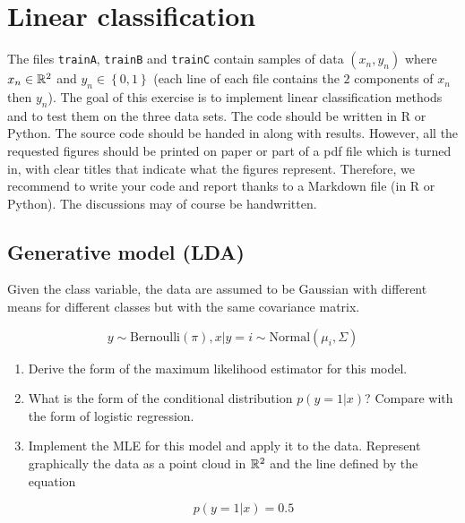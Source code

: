 \documentclass[a4paper, 11pt]{article}
\begin{document}
\pagebreak
\section{Linear classification}

The files \texttt{trainA}, \texttt{trainB} and \texttt{trainC} contain samples of data $(x_n, y_n)$ where $x_n \in \mathbb{R}^2$ and $y_n \in \left\{ 0, 1 \right\}$ (each line of each file contains the $2$ components of $x_n$ then $y_n$). The goal of this exercise is to implement linear classification methods and to test them on the three data sets. The code should be written in R or Python. The source code should be handed in along with results. However, all the requested figures should be printed on paper or part of a pdf file which is turned in, with clear titles that indicate what the figures represent. Therefore, we recommend to write your code and report thanks to a Markdown file (in R or Python). The discussions may of course be handwritten.

\subsection{Generative model (LDA)}

Given the class variable, the data are assumed to be Gaussian with different means for different classes but with the same covariance matrix.

\begin{equation*}
    y \sim \text{Bernoulli} \left( \pi \right), x|y = i \sim \text{Normal} \left( \mu_{i}, \Sigma \right)
\end{equation*}

\begin{enumerate}[label=\alph*]
    \item Derive the form of the maximum likelihood estimator for this model.
    
    \item What is the form of the conditional distribution $p \left( y = 1 | x \right)$? Compare with the form of logistic regression.
    
    \item Implement the MLE for this model and apply it to the data. Represent graphically the data as a point cloud in $\mathbb{R}^{2}$ and the line defined by the equation
    
    \begin{equation*}
        p \left( y = 1 | x \right) = 0.5
    \end{equation*}
\end{enumerate}
\end{document}
